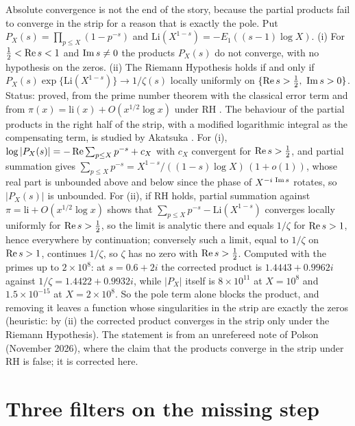 \begin{remark}\label{route:rem:partial}
Absolute convergence is not the end of the story, because the partial products fail to converge in the strip for a reason that is exactly the pole. Put $P_X(s)=\prod_{p\le X}(1-p^{-s})$ and $\mathrm{Li}(X^{1-s})=-E_1((s-1)\log X)$. (i) For $\frac12<\operatorname{Re} s<1$ and $\operatorname{Im} s\ne0$ the products $P_X(s)$ do not converge, with no hypothesis on the zeros. (ii) The Riemann Hypothesis holds if and only if $P_X(s)\exp\{\mathrm{Li}(X^{1-s})\}\to1/\zeta(s)$ locally uniformly on $\{\operatorname{Re} s>\frac12,\ \operatorname{Im} s>0\}$. Status: proved, from the prime number theorem with the classical error term and from $\pi(x)=\mathrm{li}(x)+O(x^{1/2}\log x)$ under RH \cite{Titchmarsh}. The behaviour of the partial products in the right half of the strip, with a modified logarithmic integral as the compensating term, is studied by Akatsuka \cite{Akatsuka17}. For (i), $\log|P_X(s)|=-\operatorname{Re}\sum_{p\le X}p^{-s}+c_X$ with $c_X$ convergent for $\operatorname{Re} s>\frac12$, and partial summation gives $\sum_{p\le X}p^{-s}=X^{1-s}/((1-s)\log X)\,(1+o(1))$, whose real part is unbounded above and below since the phase of $X^{-i\,\operatorname{Im} s}$ rotates, so $|P_X(s)|$ is unbounded. For (ii), if RH holds, partial summation against $\pi=\mathrm{li}+O(x^{1/2}\log x)$ shows that $\sum_{p\le X}p^{-s}-\mathrm{Li}(X^{1-s})$ converges locally uniformly for $\operatorname{Re} s>\frac12$, so the limit is analytic there and equals $1/\zeta$ for $\operatorname{Re} s>1$, hence everywhere by continuation; conversely such a limit, equal to $1/\zeta$ on $\operatorname{Re} s>1$, continues $1/\zeta$, so $\zeta$ has no zero with $\operatorname{Re} s>\frac12$. Computed with the primes up to $2\times10^8$: at $s=0.6+2i$ the corrected product is $1.4443+0.9962i$ against $1/\zeta=1.4422+0.9932i$, while $|P_X|$ itself is $8\times10^{11}$ at $X=10^8$ and $1.5\times10^{-15}$ at $X=2\times10^8$. So the pole term alone blocks the product, and removing it leaves a function whose singularities in the strip are exactly the zeros (heuristic: by (ii) the corrected product converges in the strip only under the Riemann Hypothesis). The statement is from an unrefereed note of Polson (November 2026), where the claim that the products converge in the strip under RH is false; it is corrected here.
\end{remark}

\section{Three filters on the missing step}\label{route:sec:filters}

